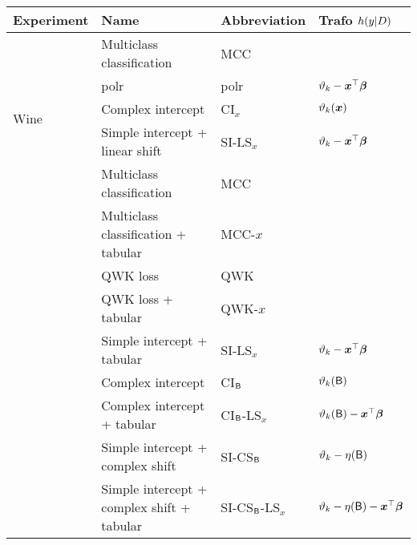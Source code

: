 \documentclass[12pt,a4paper]{standalone}
\begin{document}
\begin{table}
\centering
{}
\begin{tabular}{@{}llll@{}}
\toprule
\textbf{Experiment}
& \textbf{Name}                   & \textbf{Abbreviation} & \textbf{Trafo} $h(y \rvert D)$ \\ \midrule
\multirow{5}{*}{Wine}
& Multiclass classification       & MCC                   &                \\
& polr                            & polr                  &  $\vartheta_k - \boldsymbol x^\top\text{\boldmath$\beta$}$ \\ \cline{2-4}
& Complex intercept               & CI$_x$                &  $\vartheta_k(\boldsymbol x)$ \\
& Simple intercept + linear shift & SI-LS$_x$             &  $\vartheta_k - \boldsymbol x^\top\text{\boldmath$\beta$}$ \\ \midrule
\multirow{8}{*}{DR \& Face}
& Multiclass classification       & MCC                   &                \\
& Multiclass classification + tabular& MCC-$x$            &                \\
& QWK loss                        & QWK                   &                \\
& QWK loss + tabular              & QWK-$x$               &                \\ \cline{2-4}
& Simple intercept + tabular      & SI-LS$_x$           & $\vartheta_k - \boldsymbol x^\top\text{\boldmath$\beta$}$     \\
& Complex intercept               & CI$_{\mathsf{B}}$               & $\vartheta_k(\mathsf{B})$ \\
& Complex intercept + tabular     & CI$_{\mathsf{B}}$-LS$_x$        & $\vartheta_k(\mathsf{B}) - \boldsymbol x^\top\text{\boldmath$\beta$}$ \\
& Simple intercept + complex shift& SI-CS$_{\mathsf{B}}$            & $\vartheta_k - \eta(\mathsf{B})$ \\
& Simple intercept + complex shift + tabular& SI-CS$_{\mathsf{B}}$-LS$_x$ & $\vartheta_k - \eta(\mathsf{B}) - \boldsymbol x^\top\text{\boldmath$\beta$}$ \\ \bottomrule
\end{tabular}
\end{table}
\endminipage
\end{document}
